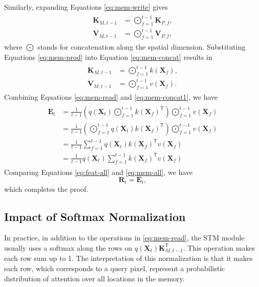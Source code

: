 \documentclass[runningheads]{llncs}
\begin{document}
Similarly, expanding Equations \eqref{eq:mem-write} gives
\begin{align}
\begin{split}
\label{eq:mem-concat}
    \bm{K}_{M, t - 1} &= \bigodot_{f = 1}^{t - 1}\bm{K}_{P, f},\\
    \bm{V}_{M, t - 1} &= \bigodot_{f = 1}^{t - 1}\bm{V}_{P, f},
\end{split}
\end{align}
where $\bigodot$ stands for concatenation along the spatial dimension. Substituting Equations \eqref{eq:mem-prod} into Equation \eqref{eq:mem-concat} results in
\begin{align}
\begin{split}
\label{eq:mem-concat1}
    \bm{K}_{M, t - 1} &= \bigodot_{f = 1}^{t - 1}k(\bm{X}_f),\\
    \bm{V}_{M, t - 1} &= \bigodot_{f = 1}^{t - 1}v(\bm{X}_f).
\end{split}
\end{align}
Combining Equations \eqref{eq:mem-read} and \eqref{eq:mem-concat1}, we have
\begin{align}
\begin{split}
\label{eq:mem-all}
    \bm{E}_t &= \frac{1}{t - 1}\left(q(\bm{X}_t)\bigodot_{f = 1}^{t - 1}k(\bm{X}_f)^\mathsf{T}\right)\bigodot_{f = 1}^{t - 1}v(\bm{X}_f)\\
    &= \frac{1}{t - 1}\left(\bigodot_{f = 1}^{t - 1}q(\bm{X}_t)k(\bm{X}_f)^\mathsf{T}\right)\bigodot_{f = 1}^{t - 1}v(\bm{X}_f)\\
    &= \frac{1}{t - 1}\sum_{f = 1}^{t - 1}q(\bm{X}_t)k(\bm{X}_f)^\mathsf{T}v(\bm{X}_f)\\
    &= \frac{1}{t - 1}q(\bm{X}_t)\sum_{f = 1}^{t - 1}k(\bm{X}_f)^\mathsf{T}v(\bm{X}_f)
\end{split}
\end{align}
Comparing Equations \eqref{eq:feat-all} and \eqref{eq:mem-all}, we have
\begin{equation}
\label{eq:qed}
    \bm{R}_t = \bm{E}_t,
\end{equation}
which completes the proof.

\subsection{Impact of Softmax Normalization}

In practice, in addition to the operations in \eqref{eq:mem-read}, the STM module usually uses a softmax along the rows on $q(\bm{X}_t)\bm{K}^\mathsf{T}_{M, t - 1}$. This operation makes each row sum up to 1. The interpretation of this normalization is that it makes each row, which corresponds to a query pixel, represent a probabilistic distribution of attention over all locations in the memory.
\end{document}
